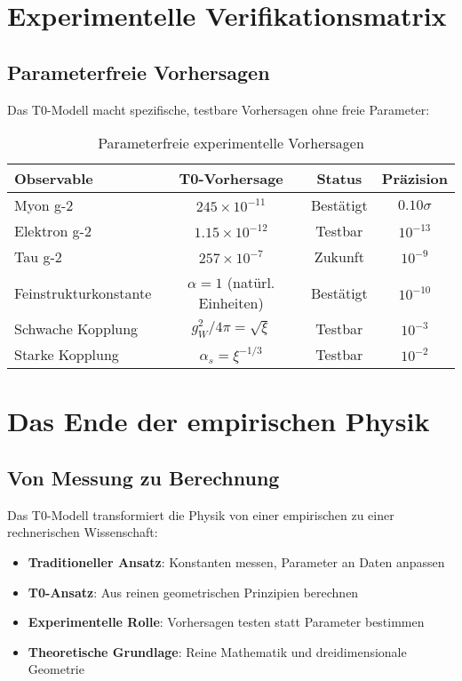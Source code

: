 \documentclass[12pt,a4paper]{report}
\begin{document}
	\section{Experimentelle Verifikationsmatrix}
	\label{sec:experimental_verification}
	
	\subsection{Parameterfreie Vorhersagen}
	\label{subsec:parameter_free_predictions}
	
	Das T0-Modell macht spezifische, testbare Vorhersagen ohne freie Parameter:
	
\begin{table}[htbp]
	\centering
	\begin{tabular}{lccc}
		\toprule
		\textbf{Observable} & \textbf{T0-Vorhersage} & \textbf{Status} & \textbf{Präzision} \\
		\midrule
		Myon g-2 & $245 \times 10^{-11}$ & Bestätigt & $0.10\sigma$ \\
		Elektron g-2 & $1.15 \times 10^{-12}$ & Testbar & $10^{-13}$ \\
		Tau g-2 & $257 \times 10^{-7}$ & Zukunft & $10^{-9}$ \\
		Feinstrukturkonstante & $\alpha = 1$ (natürl. Einheiten) & Bestätigt & $10^{-10}$ \\
		Schwache Kopplung & $g_W^2/4\pi = \sqrt{\xi}$ & Testbar & $10^{-3}$ \\
		Starke Kopplung & $\alpha_s = \xi^{-1/3}$ & Testbar & $10^{-2}$ \\
		\bottomrule
	\end{tabular}
	\caption{Parameterfreie experimentelle Vorhersagen}
	\label{tab:parameter_free_predictions}
\end{table}
	\section{Das Ende der empirischen Physik}
	\label{sec:end_empirical_physics}
	
	\subsection{Von Messung zu Berechnung}
	\label{subsec:measurement_to_calculation}
	
	Das T0-Modell transformiert die Physik von einer empirischen zu einer rechnerischen Wissenschaft:
	
	\begin{itemize}
		\item \textbf{Traditioneller Ansatz}: Konstanten messen, Parameter an Daten anpassen
		\item \textbf{T0-Ansatz}: Aus reinen geometrischen Prinzipien berechnen
		\item \textbf{Experimentelle Rolle}: Vorhersagen testen statt Parameter bestimmen
		\item \textbf{Theoretische Grundlage}: Reine Mathematik und dreidimensionale Geometrie
	\end{itemize}
	
\end{document}
